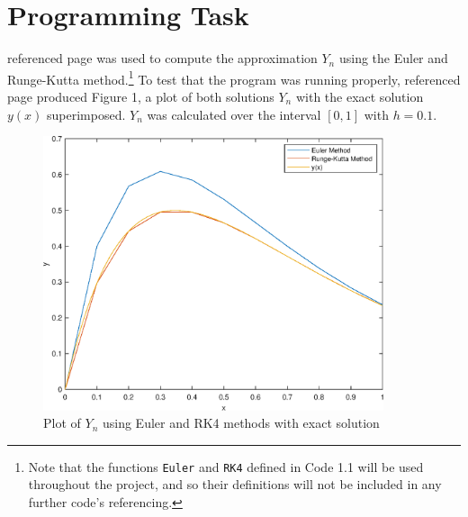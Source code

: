 \documentclass[10pt,a4paper,notitlepage]{article}
\author{Jonah Gibbon}
\begin{document}
\section*{\centering \large Programming Task}
 referenced page \pageref{subsec:Code 1.1} was used to compute the approximation $Y_{n}$ using the Euler and Runge-Kutta method.\footnote{Note that the functions \texttt{Euler} and \texttt{RK4} defined in Code 1.1 will be used throughout the project, and so their definitions will not be included in any further code's referencing.} To test that the program was running properly,  referenced page \pageref{subsec:Code 1.2} produced Figure 1, a plot of both solutions $Y_{n}$ with the exact solution $y(x)$ superimposed.  $Y_{n}$ was calculated over the interval $[0,1]$ with $h=0.1$.\\
\begin{figure}[H]
\begin{center}
\includegraphics[width=10cm]{Image_1_1}
\caption{Plot of $Y_{n}$ using Euler and RK4 methods with exact solution}
\end{center}
\end{figure}
\end{document}
